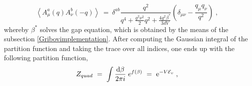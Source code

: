 \begin{equation}
\left\langle A_{\mu}^{a}(q)A_{\nu }^{b}(-q)\right\rangle ~=~  \delta^{ab}\frac{ q^2}{q^{4} + \frac{g^{2}\nu^{2}}{2} q^2
+  \frac{ 4g^2\beta^* }{3dV} }\left( \delta _{\mu\nu }-\frac{q_{\mu }q_{\nu }}{q^{2}}\right)   \;,
\label{propf0}
\end{equation}
whereby $\beta^{\ast}$ solves the gap equation, which is obtained by the means of the subsection \ref{Gribovimplementation}. After computing the Gaussian integral of the partition function and taking the trace over all indices, one ends up with the following partition function,
\begin{equation}  \label{Zf}
Z_{quad} ~=~ \int \frac{\mathrm{d}\beta}{2\pi i}\; e^{f(\beta)} ~=~ \mathrm{e}^{-V{\cal E}_{v}}   \;,
\end{equation}
